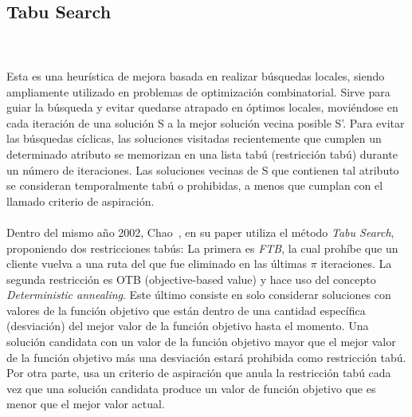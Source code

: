 \documentclass[letter, 10pt]{article}
\begin{document}
\newpage
\\
\subsection{Tabu Search}\\ 
\\
Esta es una heurística de mejora basada en realizar búsquedas locales, siendo ampliamente utilizado en problemas de optimización combinatorial. Sirve para guiar la búsqueda  y evitar quedarse atrapado en óptimos locales, moviéndose en cada iteración de una solución S a la mejor solución vecina posible  S'. Para evitar las búsquedas cíclicas, las soluciones visitadas recientemente que cumplen un determinado atributo se memorizan en una lista tabú (restricción tabú) durante un número de iteraciones.  Las soluciones vecinas de S que contienen tal atributo se consideran temporalmente tabú o prohibidas, a menos que cumplan con el llamado criterio de aspiración.
\\
\\
Dentro del mismo año 2002, Chao~\cite{Chao}, en su paper utiliza el método \textit{Tabu Search}, proponiendo dos restricciones tabús: La primera es \textit{FTB}, la cual prohíbe que un cliente vuelva a una ruta del que fue eliminado en las últimas $\pi$ iteraciones. La segunda restricción es OTB (objective-based value) y hace uso del concepto \textit{Deterministic annealing}. Este último consiste en solo considerar soluciones con valores de la función objetivo que están dentro de una cantidad específica (desviación) del mejor valor de la función objetivo hasta el momento.  Una solución candidata con un valor de la función objetivo mayor que el mejor valor de la función objetivo más una desviación estará prohibida como restricción tabú.
Por otra parte,  usa un criterio de aspiración que anula la restricción tabú cada vez que una solución candidata produce un valor de función objetivo que es menor que el mejor valor actual.
\end{document}
